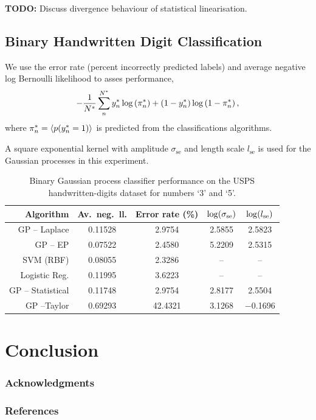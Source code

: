 \documentclass{article} %
\begin{document}
\textbf{TODO:} Discuss divergence behaviour of statistical linearisation.


\subsection{Binary Handwritten Digit Classification}

We use the error rate (percent incorrectly predicted labels) and average 
negative log Bernoulli likelihood to asses performance,
\begin{equation}
    - \frac{1}{N^{*}} \sum^{N^{*}}_{n} y^{*}_n 
        \log\left({\pi^{*}_n}\right)
    + \left({1-y^{*}_n}\right)\log\left({1 - \pi^{*}_n}\right),
\end{equation}
where $\pi^{*}_n = \left\langle{\ensuremath{p\!\left({y^{*}_n = 1}\right)}}\right\rangle_{}$ is predicted from the
classifications algorithms.

A square exponential kernel with amplitude $\sigma_\text{se}$ and length
scale $l_\text{se}$ is used for the Gaussian processes in this experiment.

\begin{table}[htb]
    \centering
    \small
    \caption[]{Binary Gaussian process classifier performance on the USPS
        handwritten-digits dataset for numbers `3' and `5'.}
    \begin{tabular}{r| c c c c}
        Algorithm & Av.\ neg.\ ll. & Error rate (\%) 
            & $\log\!\left({\sigma_\text{se}}\right)$ & $\log\!\left({l_\text{se}}\right)$ \\
        \toprule
        GP -- Laplace & 0.11528 & 2.9754 & 2.5855 & 2.5823 \\
        GP -- EP & 0.07522 & 2.4580 & 5.2209 & 2.5315 \\
        SVM (RBF) & 0.08055 & 2.3286 & -- & -- \\
        Logistic Reg. & 0.11995 & 3.6223 & -- & -- \\
        \midrule
        GP -- Statistical & 0.11748 & 2.9754 &  2.8177 & 2.5504 \\
        GP --Taylor & 0.69293 & 42.4321 & 3.1268 & $-$0.1696 \\
        \bottomrule
    \end{tabular}
\end{table}

\section{Conclusion}

\subsubsection*{Acknowledgments}

\subsubsection*{References}
\printbibliography
\end{document}
